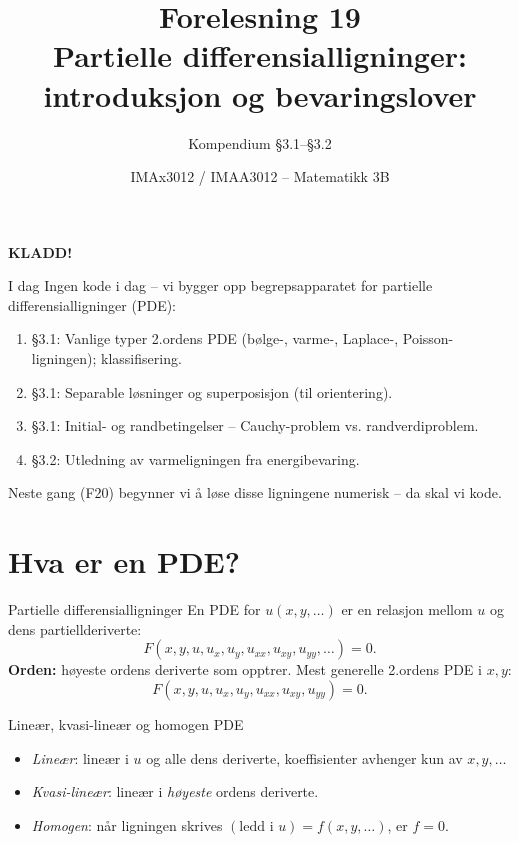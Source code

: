 \documentclass[11pt,aspectratio=169]{beamer}
\title[F19 -- PDE generelt]{Forelesning 19\\ Partielle differensialligninger: introduksjon og bevaringslover}
\subtitle{Kompendium §3.1--§3.2}
\author{IMAx3012 / IMAA3012 -- Matematikk 3B}
\date{}
\begin{document}
\begin{frame}
\begin{center}{\Huge\bfseries\color{red}KLADD!}\end{center}
\vspace{-1em}
\titlepage
\end{frame}

\begin{frame}{I dag}
Ingen kode i dag -- vi bygger opp begrepsapparatet for partielle differensialligninger (PDE):
\begin{enumerate}
\item §3.1: Vanlige typer 2.ordens PDE (bølge-, varme-, Laplace-, Poisson-ligningen); klassifisering.
\item §3.1: Separable løsninger og superposisjon (til orientering).
\item §3.1: Initial- og randbetingelser -- Cauchy-problem vs. randverdiproblem.
\item §3.2: Utledning av varmeligningen fra energibevaring.
\end{enumerate}
Neste gang (F20) begynner vi å løse disse ligningene numerisk -- da skal vi kode.
\end{frame}

\section{Hva er en PDE?}

\begin{frame}{Partielle differensialligninger}
En PDE for $u(x,y,\ldots)$ er en relasjon mellom $u$ og dens partiellderiverte:
\[
F(x,y,u,u_x,u_y,u_{xx},u_{xy},u_{yy},\ldots) = 0.
\]
\textbf{Orden:} høyeste ordens deriverte som opptrer. Mest generelle 2.ordens PDE i $x,y$:
\[
F(x,y,u,u_x,u_y,u_{xx},u_{xy},u_{yy})=0.
\]
\begin{defnb}{Lineær, kvasi-lineær og homogen PDE}
\begin{itemize}
\item \emph{Lineær}: lineær i $u$ og alle dens deriverte, koeffisienter avhenger kun av $x,y,\ldots$
\item \emph{Kvasi-lineær}: lineær i \emph{høyeste} ordens deriverte.
\item \emph{Homogen}: når ligningen skrives $(\text{ledd i } u) = f(x,y,\ldots)$, er $f=0$.
\end{itemize}
\end{defnb}
\end{frame}
\end{document}
